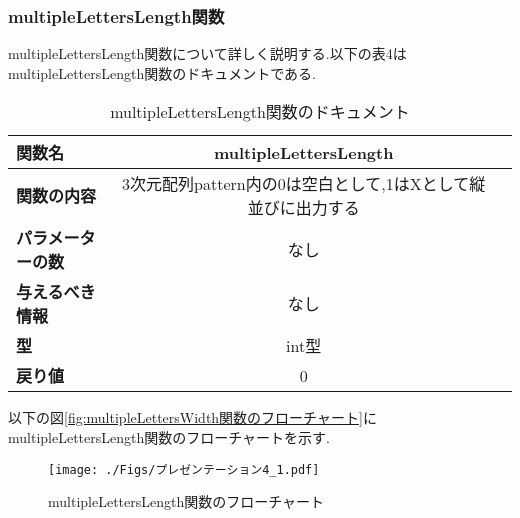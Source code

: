 \documentclass[uplatex,dvipdfmx]{jsarticle}
\begin{document}
\subsubsection{multipleLettersLength関数}
multipleLettersLength関数について詳しく説明する.以下の表4はmultipleLettersLength関数のドキュメントである.
\newpage
\begin{table}[h]
    \centering
    \caption{multipleLettersLength関数のドキュメント}
    \begin{tabular}{@{}lcc@{}}
    \toprule
    \textbf{関数名}         & \textbf{multipleLettersLength}                                        \\ \midrule
    \textbf{関数の内容}                &    3次元配列pattern内の0は空白として,1はXとして縦並びに出力する\\
    \textbf{パラメーターの数}               &     なし                                \\ 
    \textbf{与えるべき情報}             &     なし                        \\ 
    \textbf{型}                &     int型                    \\ 
    \textbf{戻り値}                & 0                              \\ \bottomrule
  \end{tabular}
\end{table}

以下の図\ref{fig:multipleLettersWidth関数のフローチャート}にmultipleLettersLength関数のフローチャートを示す.
\begin{figure}[h]
    \centering
    \texttt{[image: ./Figs/プレゼンテーション4\_1.pdf]}
    \caption{multipleLettersLength関数のフローチャート}
    \label{fig:multipleLettersLength関数のフローチャート}
\end{figure}
\end{document}

